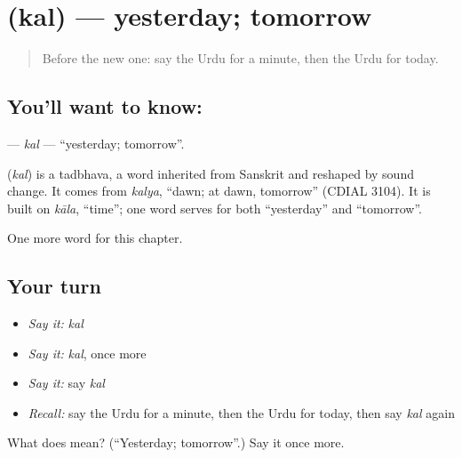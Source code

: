\section[\texorpdfstring{\ur{کل} (kal)}{کل (kal)}]{ (kal) — yesterday; tomorrow}

\label{lesson:UR-C76-kal}



\begin{quote}
Before the new one: say the Urdu for a minute, then the Urdu for today.
\end{quote}

\subsection*{You'll want to know: }
\textbf{} — \emph{kal} — \textquotedblleft{}yesterday; tomorrow\textquotedblright{}.

\begin{cousinweb}
\textbf{} (\emph{kal}) is a tadbhava, a word inherited from Sanskrit and reshaped by sound change. It comes from \emph{kalya}, \textquotedblleft{}dawn; at dawn, tomorrow\textquotedblright{} (CDIAL 3104). It is built on \emph{kāla}, \textquotedblleft{}time\textquotedblright{}; one word serves for both \textquotedblleft{}yesterday\textquotedblright{} and \textquotedblleft{}tomorrow\textquotedblright{}.
\end{cousinweb}

\begin{grammarlens}[title={What you've built}]
One more word for this chapter.
\end{grammarlens}

\subsection*{Your turn}
\begin{itemize}
\raggedright
  \item \emph{Say it:} \emph{kal}
  \item \emph{Say it:} \emph{kal}, once more
  \item \emph{Say it:} say \emph{kal}
  \item \emph{Recall:} say the Urdu for a minute, then the Urdu for today, then say \emph{kal} again
\end{itemize}

\begin{tcolorbox}[breakable,colback=teal!4,colframe=teal!35!black,title={Before you move on}]
What does  mean? (\textquotedblleft{}Yesterday; tomorrow\textquotedblright{}.) Say it once more.
\end{tcolorbox}
